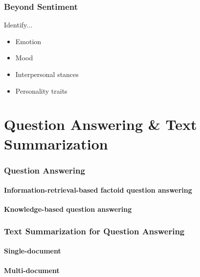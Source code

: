 \documentclass[10pt,twocolumn]{article}
\begin{document}
\section{Beyond Sentiment}

Identify...
\begin{itemize}
\item Emotion
\item Mood
\item Interpersonal stances
\item Personality traits
\end{itemize}


\pagebreak
\part{Question Answering \& Text Summarization}

\section{Question Answering}

\subsection{Information-retrieval-based factoid question answering}

\subsection{Knowledge-based question answering}

\section{Text Summarization for Question Answering}

\subsection{Single-document}

\subsection{Multi-document}
\end{document}
